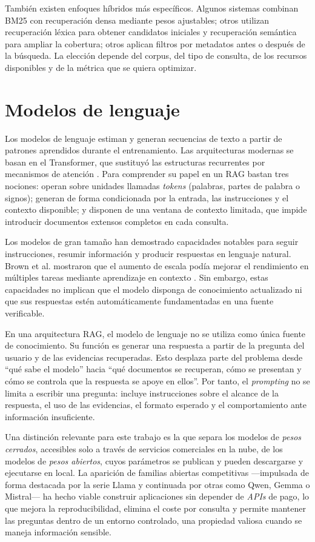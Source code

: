También existen enfoques híbridos más específicos. Algunos sistemas combinan BM25 con recuperación densa mediante pesos ajustables; otros utilizan recuperación léxica para obtener candidatos iniciales y recuperación semántica para ampliar la cobertura; otros aplican filtros por metadatos antes o después de la búsqueda. La elección depende del corpus, del tipo de consulta, de los recursos disponibles y de la métrica que se quiera optimizar.

\section{Modelos de lenguaje}
\label{sec:modelos-lenguaje}

Los modelos de lenguaje estiman y generan secuencias de texto a partir de patrones aprendidos durante el entrenamiento. Las arquitecturas modernas se basan en el Transformer, que sustituyó las estructuras recurrentes por mecanismos de atención \cite{vaswani2017attention}. Para comprender su papel en un RAG bastan tres nociones: operan sobre unidades llamadas \emph{tokens} (palabras, partes de palabra o signos); generan de forma condicionada por la entrada, las instrucciones y el contexto disponible; y disponen de una ventana de contexto limitada, que impide introducir documentos extensos completos en cada consulta.

Los modelos de gran tamaño han demostrado capacidades notables para seguir instrucciones, resumir información y producir respuestas en lenguaje natural. Brown et al. mostraron que el aumento de escala podía mejorar el rendimiento en múltiples tareas mediante aprendizaje en contexto \cite{brown2020language}. Sin embargo, estas capacidades no implican que el modelo disponga de conocimiento actualizado ni que sus respuestas estén automáticamente fundamentadas en una fuente verificable.

En una arquitectura RAG, el modelo de lenguaje no se utiliza como única fuente de conocimiento. Su función es generar una respuesta a partir de la pregunta del usuario y de las evidencias recuperadas. Esto desplaza parte del problema desde ``qué sabe el modelo'' hacia ``qué documentos se recuperan, cómo se presentan y cómo se controla que la respuesta se apoye en ellos''. Por tanto, el \emph{prompting} no se limita a escribir una pregunta: incluye instrucciones sobre el alcance de la respuesta, el uso de las evidencias, el formato esperado y el comportamiento ante información insuficiente.

Una distinción relevante para este trabajo es la que separa los modelos de \emph{pesos cerrados}, accesibles solo a través de servicios comerciales en la nube, de los modelos de \emph{pesos abiertos}, cuyos parámetros se publican y pueden descargarse y ejecutarse en local. La aparición de familias abiertas competitivas —impulsada de forma destacada por la serie Llama \cite{touvron2023llama2} y continuada por otras como Qwen, Gemma o Mistral— ha hecho viable construir aplicaciones sin depender de \emph{APIs} de pago, lo que mejora la reproducibilidad, elimina el coste por consulta y permite mantener las preguntas dentro de un entorno controlado, una propiedad valiosa cuando se maneja información sensible.

